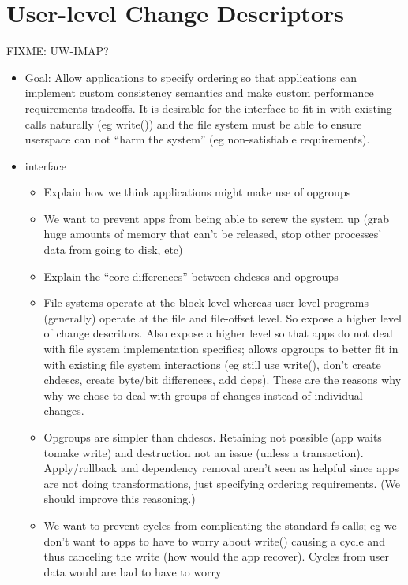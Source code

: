 \section{User-level Change Descriptors}
\label{opgroup}

FIXME: UW-IMAP?

\begin{itemize}
\item Goal: Allow applications to specify ordering so that
  applications can implement custom consistency semantics and make
  custom performance requirements tradeoffs. It is desirable for the
  interface to fit in with existing calls naturally (eg write()) and
  the file system must be able to ensure userspace can not ``harm the
  system'' (eg non-satisfiable requirements).
\item interface
  \begin{itemize}
  \item Explain how we think applications might make use of opgroups
  \item We want to prevent apps from being able to screw the system up
    (grab huge amounts of memory that can't be released, stop other
    processes' data from going to disk, etc)
  \item Explain the ``core differences'' between chdescs and
    opgroups
  \item File systems operate at the block level whereas user-level
    programs (generally) operate at the file and file-offset level.
    So expose a higher level of change descritors. Also expose a
    higher level so that apps do not deal with file system
    implementation specifics; allows opgroups to better fit in with
    existing file system interactions (eg still use write(), don't
    create chdescs, create byte/bit differences, add deps). These are
    the reasons why why we chose to deal with groups of changes
    instead of individual changes.
  \item Opgroups are simpler than chdescs. Retaining not possible (app
    waits tomake write) and destruction not an issue (unless a
    transaction). Apply/rollback and dependency removal aren't seen as
    helpful since apps are not doing transformations, just specifying
    ordering requirements. (We should improve this reasoning.)
  \item We want to prevent cycles from complicating the standard fs
    calls; eg we don't want to apps to have to worry about write()
    causing a cycle and thus canceling the write (how would the app
    recover). Cycles from user data would are bad to have to worry

\end{itemize}
\end{itemize}
